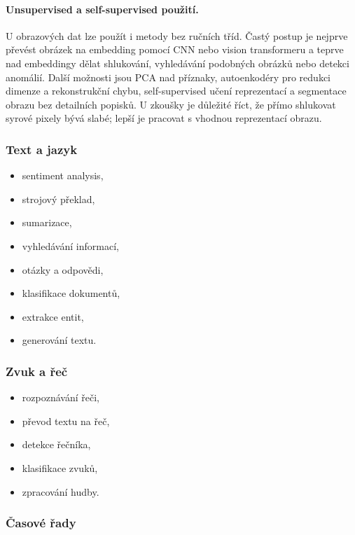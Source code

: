 \paragraph{Unsupervised a self-supervised použití.}
U obrazových dat lze použít i metody bez ručních tříd. Častý postup je nejprve převést obrázek na
embedding pomocí CNN nebo vision transformeru a teprve nad embeddingy dělat shlukování, vyhledávání
podobných obrázků nebo detekci anomálií. Další možnosti jsou PCA nad příznaky, autoenkodéry pro redukci
dimenze a rekonstrukční chybu, self-supervised učení reprezentací a segmentace obrazu bez detailních
popisků. U zkoušky je důležité říct, že přímo shlukovat syrové pixely bývá slabé; lepší je pracovat
s vhodnou reprezentací obrazu.

\subsubsection{Text a jazyk}

\begin{itemize}
    \item sentiment analysis,
    \item strojový překlad,
    \item sumarizace,
    \item vyhledávání informací,
    \item otázky a odpovědi,
    \item klasifikace dokumentů,
    \item extrakce entit,
    \item generování textu.
\end{itemize}

\subsubsection{Zvuk a řeč}

\begin{itemize}
    \item rozpoznávání řeči,
    \item převod textu na řeč,
    \item detekce řečníka,
    \item klasifikace zvuků,
    \item zpracování hudby.
\end{itemize}

\subsubsection{Časové řady}

